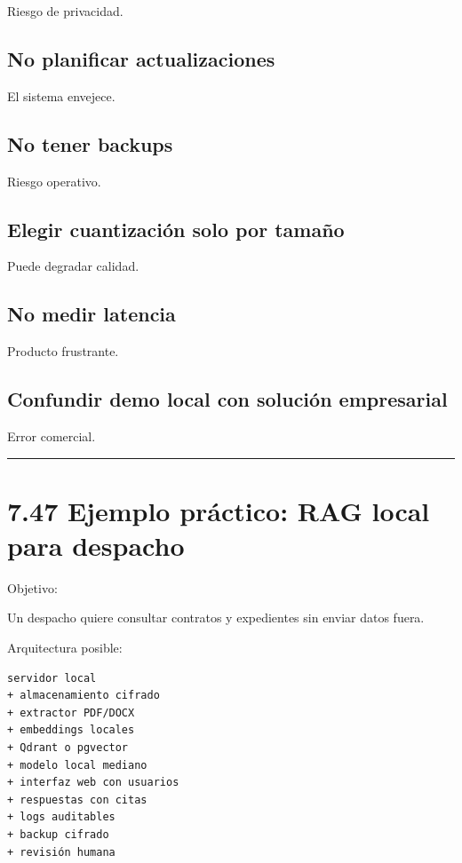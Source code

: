 Riesgo de privacidad.

\subsection{No planificar
actualizaciones}\label{no-planificar-actualizaciones}

El sistema envejece.

\subsection{No tener backups}\label{no-tener-backups}

Riesgo operativo.

\subsection{Elegir cuantización solo por
tamaño}\label{elegir-cuantizaciuxf3n-solo-por-tamauxf1o}

Puede degradar calidad.

\subsection{No medir latencia}\label{no-medir-latencia}

Producto frustrante.

\subsection{Confundir demo local con solución
empresarial}\label{confundir-demo-local-con-soluciuxf3n-empresarial}

Error comercial.

\begin{center}\rule{0.5\linewidth}{0.5pt}\end{center}

\section{7.47 Ejemplo práctico: RAG local para
despacho}\label{ejemplo-pruxe1ctico-rag-local-para-despacho}

Objetivo:

Un despacho quiere consultar contratos y expedientes sin enviar datos
fuera.

Arquitectura posible:

\begin{lstlisting}
servidor local
+ almacenamiento cifrado
+ extractor PDF/DOCX
+ embeddings locales
+ Qdrant o pgvector
+ modelo local mediano
+ interfaz web con usuarios
+ respuestas con citas
+ logs auditables
+ backup cifrado
+ revisión humana
\end{lstlisting}

